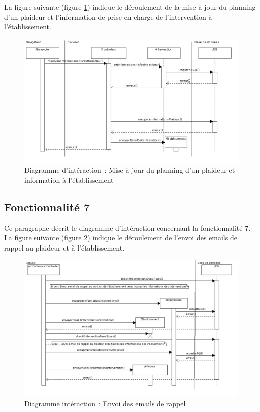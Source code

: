 La figure suivante (figure \ref{diagrammeInteraction8}) indique le déroulement de la mise à jour du planning d'un plaideur et l'information de prise en charge de l'intervention à l'établissement.
\begin{figure}[H]
	\centering
	\includegraphics[scale=0.5]{../../lot2/DCP/images/diagrammesInteraction/08_diagrammeInteractionF6.png}
	\caption{Diagramme d'intéraction~: Mise à jour du planning d'un plaideur et information à l'établissement}
	\label{diagrammeInteraction8}
\end{figure}




\subsection{Fonctionnalité 7}
Ce paragraphe décrit le diagramme d'intéraction concernant la fonctionnalité 7.\\

La figure suivante (figure \ref{diagrammeInteraction9}) indique le déroulement de l'envoi des emails de rappel au plaideur et à l'établissement.
\begin{figure}[H]
	\centering
	\includegraphics[scale=0.5]{../../lot2/DCP/images/diagrammesInteraction/09_diagrammeInteractionF7.png}
	\caption{Diagramme intéraction~: Envoi des emails de rappel}
	\label{diagrammeInteraction9}
\end{figure}

